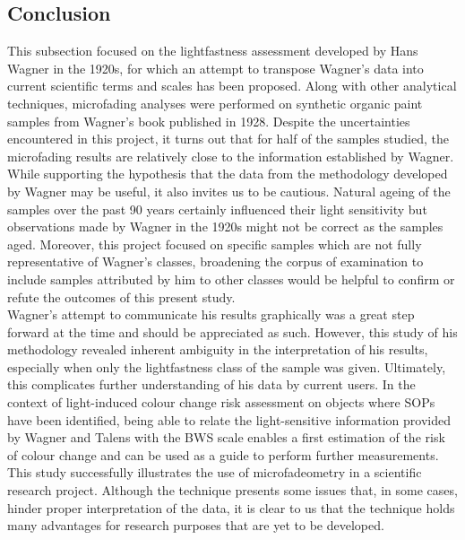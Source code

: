 \subsection{Conclusion}

This subsection focused on the lightfastness assessment developed by Hans Wagner in the 1920s, for which an attempt to transpose Wagner's data into current scientific terms and scales has been proposed. Along with other analytical techniques, microfading analyses were performed on synthetic organic paint samples from Wagner’s book published in 1928. Despite the uncertainties encountered in this project, it turns out that for half of the samples studied, the microfading results are relatively close to the information established by Wagner. While supporting the hypothesis that the data from the methodology developed by Wagner may be useful, it also invites us to be cautious. Natural ageing of the samples over the past 90 years certainly influenced their light sensitivity but observations made by Wagner in the 1920s might not be correct as the samples aged. Moreover, this project focused on specific samples which are not fully representative of Wagner's classes, broadening the corpus of examination to include samples attributed by him to other classes would be helpful to confirm or refute the outcomes of this present study.\\

Wagner's attempt to communicate his results graphically was a great step forward at the time and should be appreciated as such. However, this study of his methodology revealed inherent ambiguity in the interpretation of his results, especially when only the lightfastness class of the sample was given. Ultimately, this complicates further understanding of his data by current users. In the context of light-induced colour change risk assessment on objects where \gls{SOP}s have been identified, being able to relate the light-sensitive information provided by Wagner and Talens with the \gls{BWS} scale enables a first estimation of the risk of colour change and can be used as a guide to perform further measurements.\\

This study successfully illustrates the use of microfadeometry in a scientific research project. Although the technique presents some issues that, in some cases, hinder proper interpretation of the data, it is clear to us that the technique holds many advantages for research purposes that are yet to be developed. \\




